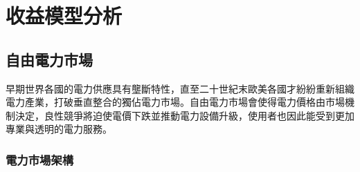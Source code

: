 
\section{收益模型分析}

\subsection{自由電力市場}

早期世界各國的電力供應具有壟斷特性，直至二十世紀末歐美各國才紛紛重新組織電力產業，打破垂直整合的獨佔電力市場。自由電力市場會使得電力價格由市場機制決定，良性競爭將迫使電價下跌並推動電力設備升級，使用者也因此能受到更加專業與透明的電力服務。

\subsubsection{電力市場架構}

